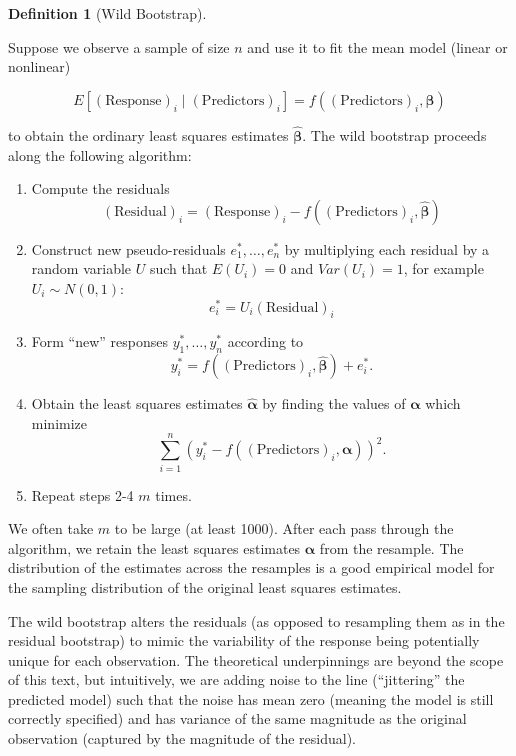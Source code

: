 \documentclass[
  letterpaper,
  DIV=11,
  numbers=noendperiod]{scrreprt}
\providecommand{\tightlist}{%
  \setlength{\itemsep}{0pt}\setlength{\parskip}{0pt}}\usepackage{longtable,booktabs,array}
\theoremstyle{definition}
\newtheorem{definition}{Definition}[chapter]
\theoremstyle{definition}
\theoremstyle{remark}
\begin{document}
\begin{definition}[Wild
Bootstrap]\protect\hypertarget{def-wild-bootstrap}{}\label{def-wild-bootstrap}

Suppose we observe a sample of size \(n\) and use it to fit the mean
model (linear or nonlinear)

\[E\left[(\text{Response})_i \mid (\text{Predictors})_i\right]= f\left((\text{Predictors})_i, \boldsymbol{\beta}\right)\]

to obtain the ordinary least squares estimates
\(\widehat{\boldsymbol{\beta}}\). The wild bootstrap proceeds along the
following algorithm:

\begin{enumerate}
\def\labelenumi{\arabic{enumi}.}
\tightlist
\item
  Compute the residuals
  \[(\text{Residual})_i = (\text{Response})_i - f\left((\text{Predictors})_i, \widehat{\boldsymbol{\beta}}\right)\]
\item
  Construct new pseudo-residuals \(e_1^*, \dotsc, e_n^*\) by multiplying
  each residual by a random variable \(U\) such that
  \(E\left(U_i\right) = 0\) and \(Var\left(U_i\right) = 1\), for example
  \(U_i \sim N(0,1)\): \[e_i^* = U_i (\text{Residual})_i\]
\item
  Form ``new'' responses \(y_1^*, \dotsc, y_n^*\) according to
  \[y_i^* = f\left((\text{Predictors})_i, \widehat{\boldsymbol{\beta}}\right) + e_i^*.\]
\item
  Obtain the least squares estimates \(\widehat{\boldsymbol{\alpha}}\)
  by finding the values of \(\boldsymbol{\alpha}\) which minimize
  \[\sum_{i=1}^{n} \left(y_i^* - f\left((\text{Predictors})_i, \boldsymbol{\alpha}\right)\right)^2.\]
\item
  Repeat steps 2-4 \(m\) times.
\end{enumerate}

We often take \(m\) to be large (at least 1000). After each pass through
the algorithm, we retain the least squares estimates
\(\widehat{\boldsymbol{\alpha}}\) from the resample. The distribution of
the estimates across the resamples is a good empirical model for the
sampling distribution of the original least squares estimates.

\end{definition}

The wild bootstrap alters the residuals (as opposed to resampling them
as in the residual bootstrap) to mimic the variability of the response
being potentially unique for each observation. The theoretical
underpinnings are beyond the scope of this text, but intuitively, we are
adding noise to the line (``jittering'' the predicted model) such that
the noise has mean zero (meaning the model is still correctly specified)
and has variance of the same magnitude as the original observation
(captured by the magnitude of the residual).
\end{document}
